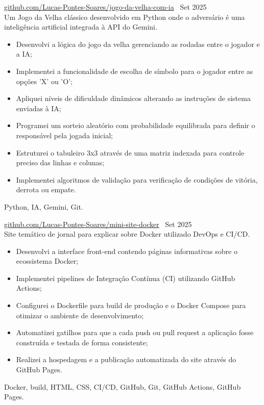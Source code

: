  \textbar{}  \href{https://github.com/Lucas-Pontes-Soares/jogo-da-velha-com-ia}{github.com/Lucas-Pontes-Soares/jogo-da-velha-com-ia} \hfill\ Set 2025 \\
Um Jogo da Velha clássico desenvolvido em Python onde o adversário é uma inteligência artificial integrada à API do Gemini.
\begin{itemize}
    \item Desenvolvi a lógica do jogo da velha gerenciando as rodadas entre o jogador e a IA;
    \item Implementei a funcionalidade de escolha de símbolo para o jogador entre as opções 'X' ou 'O';
    \item Apliquei níveis de dificuldade dinâmicos alterando as instruções de sistema enviadas à IA;
    \item Programei um sorteio aleatório com probabilidade equilibrada para definir o responsável pela jogada inicial;
    \item Estruturei o tabuleiro 3x3 através de uma matriz indexada para controle preciso das linhas e colunas;
    \item Implementei algoritmos de validação para verificação de condições de vitória, derrota ou empate.
\end{itemize}
 Python, IA, Gemini, Git.

        
 \textbar{}  \href{https://github.com/Lucas-Pontes-Soares/mini-site-docker}{github.com/Lucas-Pontes-Soares/mini-site-docker} \hfill\ Set 2025 \\
Site temático de jornal para explicar sobre Docker utilizado DevOps e CI/CD.
\begin{itemize}
    \item Desenvolvi a interface front-end contendo páginas informativas sobre o ecossistema Docker;
    \item Implementei pipelines de Integração Contínua (CI) utilizando GitHub Actions;
    \item Configurei o Dockerfile para build de produção e o Docker Compose para otimizar o ambiente de desenvolvimento;
    \item Automatizei gatilhos para que a cada push ou pull request a aplicação fosse construída e testada de forma consistente;
    \item Realizei a hospedagem e a publicação automatizada do site através do GitHub Pages.
\end{itemize}
 Docker, build, HTML, CSS, CI/CD, GitHub, Git, GitHub Actions, GitHub Pages.

